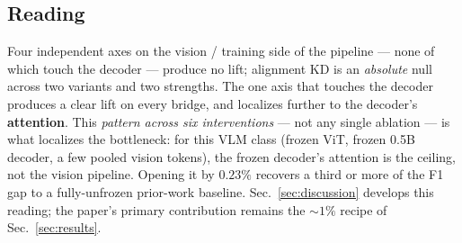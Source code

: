 \subsection{Reading}
\label{sec:abl-summary}

Four independent axes on the vision / training side of the pipeline --- none of
which touch the decoder --- produce no lift; alignment KD is an
\emph{absolute} null across two variants and two strengths. The one axis that
touches the decoder produces a clear lift
on every bridge, and localizes further to the decoder's \textbf{attention}. This
\emph{pattern across six interventions} --- not any single ablation --- is what
localizes the bottleneck: for this VLM class (frozen ViT, frozen 0.5B decoder, a
few pooled vision tokens), the frozen decoder's attention is the ceiling, not the
vision pipeline. Opening it by $0.23\%$ recovers a third or more of the F1 gap to
a fully-unfrozen prior-work baseline. Sec.~\ref{sec:discussion} develops this
reading; the paper's primary contribution remains the ${\sim}1\%$ recipe of
Sec.~\ref{sec:results}.

